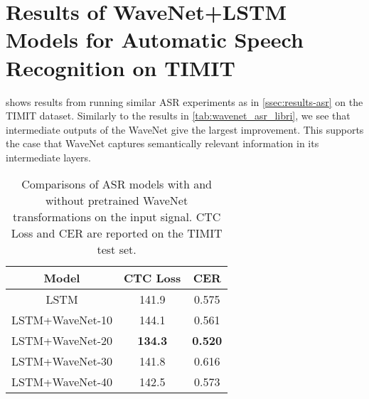 \section{Results of WaveNet+LSTM Models for Automatic Speech Recognition on TIMIT}\label{appx:wavenet-asr-timit}

 shows results from running similar ASR experiments as in \cref{ssec:results-asr} on the TIMIT dataset. 
Similarly to the results in \cref{tab:wavenet_asr_libri}, we see that intermediate outputs of the WaveNet give the largest improvement.
This supports the case that WaveNet captures semantically relevant information in its intermediate layers. 


\begin{table}[hb]
    \centering
    \vspace{12pt}
    \begin{tabular}{c||c|c}
        Model & CTC Loss & CER \\
        \hline
        LSTM & 141.9 & 0.575\\ %
        LSTM+WaveNet-10 & 144.1 & 0.561 \\ %
        LSTM+WaveNet-20 & \textbf{134.3} & \textbf{0.520} \\ %
        LSTM+WaveNet-30 & 141.8 & 0.616 \\ %
        LSTM+WaveNet-40 & 142.5 & 0.573 \\ %
    \end{tabular}
    
    \caption{Comparisons of ASR models with and without pretrained WaveNet transformations on the input signal. CTC Loss and CER are reported on the TIMIT test set.}
    \label{tab:wavenet_asr_timit}
\end{table}%